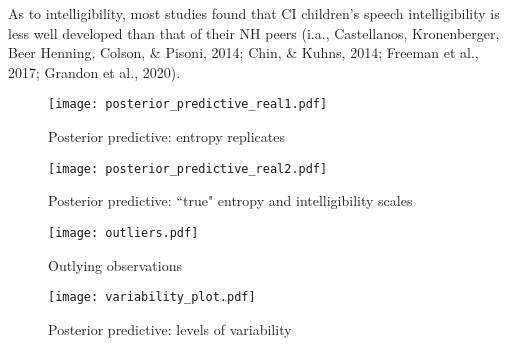 As to intelligibility, most studies found that CI children’s speech intelligibility is less
well developed than that of their NH peers (i.a., Castellanos, Kronenberger, Beer Henning, Colson, \& Pisoni, 2014; Chin, \& Kuhns, 2014; Freeman et al., 2017; Grandon et al., 2020). 
%
\begin{figure}
	\centering
	\texttt{[image: posterior\_predictive\_real1.pdf]}
	\caption[Posterior predictive: entropy replicates]{Posterior predictive: entropy replicates}
	\label{fig:predictive1}
\end{figure}
%
\begin{figure}
	\centering
	\texttt{[image: posterior\_predictive\_real2.pdf]}
	\caption[Posterior predictive: ``true'' entropy and intelligibility scales]{Posterior predictive: ``true" entropy and intelligibility scales}
	\label{fig:predictive2}
\end{figure}
%
\begin{figure}
	\centering
	\texttt{[image: outliers.pdf]}
	\caption[Outlying observations]{Outlying observations}
	\label{fig:outliers}
\end{figure}
%
\begin{figure}
	\centering
	\texttt{[image: variability\_plot.pdf]}
	\caption[Posterior predictive: levels of variability]{Posterior predictive: levels of variability}
	\label{fig:variability}
\end{figure}